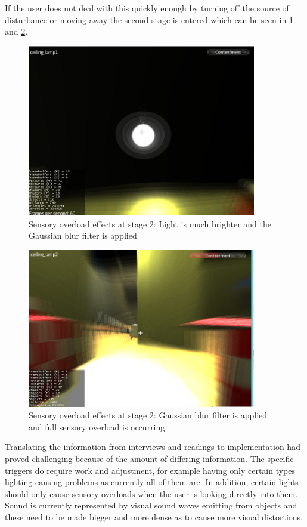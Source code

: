 \documentclass[11pt]{report}
\begin{document}
If the user does not deal with this quickly enough by turning off the source of disturbance or moving away the second stage is entered which can be seen in \ref{prototype_so1s2} and \ref{prototype_so2s2}. 

\begin{figure}[H]
\centering
\includegraphics[width=100mm]{images/prototype/bedroom_lightsensory.png}
\caption{Sensory overload effects at stage 2: Light is much brighter and the Gaussian blur filter is applied}
\label{prototype_so1s2}
\end{figure}

\begin{figure}[H]
\centering
\includegraphics[width=100mm]{images/prototype/so_kitchen.png}
\caption{Sensory overload effects at stage 2: Gaussian blur filter is applied and full sensory overload is occurring}
\label{prototype_so2s2}
\end{figure}

Translating the information from interviews and readings to implementation had proved challenging because of the amount of differing information. The specific triggers do require work and adjustment, for example having only certain types lighting causing problems as currently all of them are. In addition, certain lights should only cause sensory overloads when the user is looking directly into them. Sound is currently represented by visual sound waves emitting from objects and these need to be made bigger and more dense as to cause more visual distortions.
\end{document}
